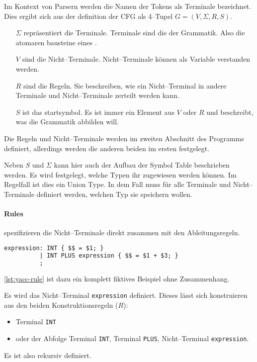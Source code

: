 Im Kontext von Parsern werden die Namen der Tokens als Terminale bezeichnet.
Dies ergibt sich aus der definition der \ac{CFG} als 4--Tupel $G=(V,\Sigma,R,S)$.~\autocite{wikipedia-contributors-2024H}
\begin{itemize}
    \item[$\Sigma$] repräsentiert die Terminale.
    Terminale sind die  der Grammatik.
    Also die atomaren bausteine eines .
    \item[$V$] sind die Nicht--Terminale.
    Nicht--Terminale können als Variable verstanden werden.
    \item[$R$] sind die Regeln.
    Sie beschreiben, wie ein Nicht--Terminal in andere Terminale und Nicht--Terminale zerteilt werden kann.
    \item[$S$] ist das startsymbol.
    Es ist immer ein Element aus $V$ oder $R$ und beschreibt, was die Grammatik abbilden will.
\end{itemize}
Die Regeln und Nicht--Terminale werden im zweiten Abschnitt des Programms definiert, allerdings werden die anderen beiden im ersten festgelegt.

Neben $S$ und $\Sigma$ kann hier auch der Aufbau der Symbol Table beschrieben werden.
Es wird festgelegt, welche Typen ihr zugewiesen werden können.
Im Regelfall ist dies ein Union Type.
In dem Fall muss für alle Terminale und Nicht--Terminale definiert werden, welchen Typ sie speichern wollen.

\paragraph{Rules} spezifizieren die Nicht--Terminale direkt zusammen mit den Ableitungsregeln.
\begin{lstlisting}[label={lst:yacc-rule},caption={\acs{YACC} Regel},language=yacc]
expression: INT { $$ = $1; }
          | INT PLUS expression { $$ = $1 + $3; }
          ;
\end{lstlisting}
\autoref{lst:yacc-rule} ist dazu ein komplett fiktives Beispiel ohne Zusammenhang.

Es wird das Nicht--Terminal \verb|expression| definiert.
Dieses lässt sich konstruieren aus den beiden Konstruktionsregeln ($R$):
\begin{itemize}
    \item Terminal \verb|INT|
    \item oder der Abfolge Terminal \verb|INT|, Terminal \verb|PLUS|, Nicht--Terminal \verb|expression|.
\end{itemize}
Es ist also rekursiv definiert.

